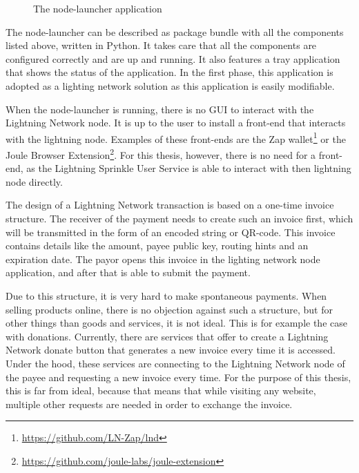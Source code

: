 
\begin{figure}[h!]
  \setlength{\fboxsep}{0pt}%
  \center
  \caption{The node-launcher application}
\end{figure}

The node-launcher can be described as package bundle with all the components listed above, written in Python. It takes care that all the components are configured correctly and are up and running. It also features a tray application that shows the status of the application. In the first phase, this application is adopted as a lighting network solution as this application is easily modifiable.

When the node-launcher is running, there is no GUI to interact with the Lightning Network node. It is up to the user to install a front-end that interacts with the lightning node. Examples of these front-ends are the Zap wallet\footnote{\url{https://github.com/LN-Zap/lnd}} or the Joule Browser Extension\footnote{\url{https://github.com/joule-labs/joule-extension}}. For this thesis, however, there is no need for a front-end, as the Lightning Sprinkle User Service is able to interact with then lightning node directly. 

The design of a Lightning Network transaction is based on a one-time invoice structure. The receiver of the payment needs to create such an invoice first, which will be transmitted in the form of an encoded string or QR-code. This invoice contains details like the amount, payee public key, routing hints and an expiration date. The payor opens this invoice in the lighting network node application, and after that is able to submit the payment.

Due to this structure, it is very hard to make spontaneous payments. When selling products online, there is no objection against such a structure, but for other things than goods and services, it is not ideal. This is for example the case with donations. Currently, there are services that offer to create a Lightning Network donate button that generates a new invoice every time it is accessed. Under the hood, these services are connecting to the Lightning Network node of the payee and requesting a new invoice every time. For the purpose of this thesis, this is far from ideal, because that means that while visiting any website, multiple other requests are needed in order to exchange the invoice. 

